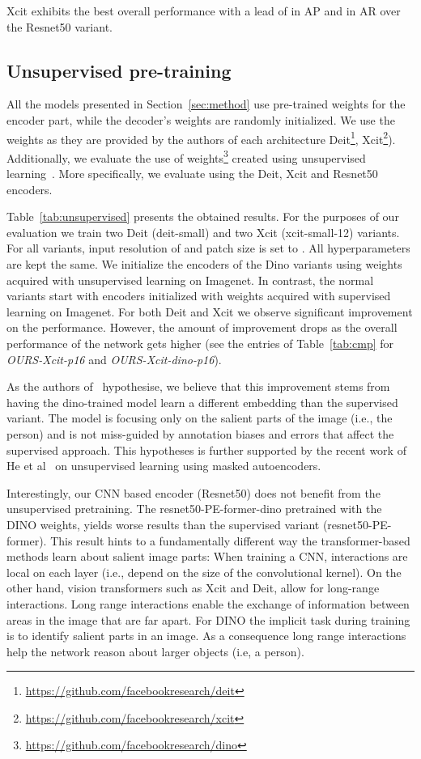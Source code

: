 \documentclass[runningheads]{llncs}
\begin{document}
Xcit exhibits the best overall performance with a lead of  in AP and  in AR over the Resnet50 variant.


\subsection{Unsupervised pre-training}
\label{sec:exp_unsupervised}
All the models presented in Section~\ref{sec:method} use pre-trained 
weights for the encoder part, while the decoder's weights are randomly initialized.
We use the weights as they are provided by the authors of each architecture 
Deit\footnote{\url{https://github.com/facebookresearch/deit}},
Xcit\footnote{\url{https://github.com/facebookresearch/xcit}}). 
Additionally, we evaluate the use of weights\footnote{\url{https://github.com/facebookresearch/dino}}
created using unsupervised learning~\cite{caron2021emerging}.
More specifically, we evaluate using the Deit, Xcit and Resnet50 encoders.

Table~\ref{tab:unsupervised} presents the obtained results.
For the purposes of our evaluation we train two Deit (deit-small) and two Xcit (xcit-small-12) variants. For all variants, input resolution of  and patch size is set to . All hyperparameters are kept the same. We initialize the encoders of the Dino 
variants using weights acquired with unsupervised learning on Imagenet. In contrast, the normal variants start with encoders initialized with weights acquired with supervised learning on Imagenet. For both Deit and Xcit we observe significant improvement on the performance. 
However, the amount of improvement drops as the overall performance of the network gets higher (see the entries of Table~\ref{tab:cmp} for \emph{OURS-Xcit-p16} and \emph{OURS-Xcit-dino-p16}).

As the authors of~\cite{caron2021emerging} hypothesise, we believe that this improvement 
stems from having the dino-trained model learn a different embedding than the supervised variant. 
The model is focusing only on the salient parts of the image (i.e., the person) and is not miss-guided by  annotation biases and errors that affect the supervised approach. This hypotheses is further supported by the recent work of He et al~\cite{he2021masked} on unsupervised learning using masked autoencoders.

Interestingly, our CNN based encoder (Resnet50) does not benefit from the unsupervised pretraining. The resnet50-PE-former-dino pretrained with the DINO weights, yields worse results than the supervised
variant (resnet50-PE-former). This result hints to a fundamentally different way the transformer-based methods learn about salient image parts:
When training a CNN, interactions are local on each layer (i.e., depend on the size of the convolutional kernel). 
On the other hand, vision transformers such as Xcit and Deit, allow for long-range interactions. Long range interactions enable the exchange of information between areas in the image that are far apart. For DINO the implicit task during training is to identify salient parts in an image. As a consequence long range interactions help the network reason about larger objects (i.e, a person).
\end{document}
